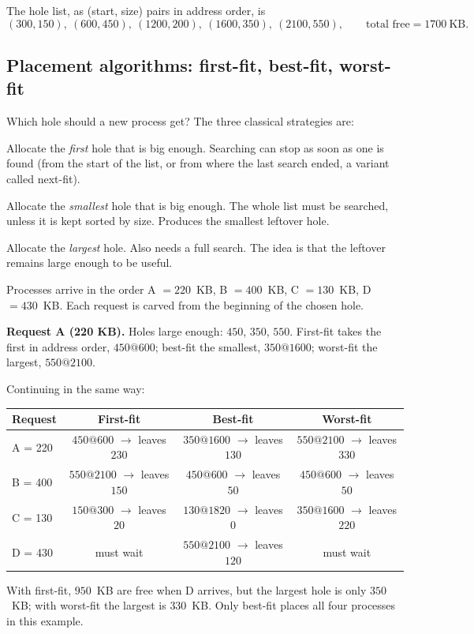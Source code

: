 \documentclass[11pt,a4paper]{article}
\begin{document}
The hole list, as (start, size) pairs in address order, is
\[
(300,150),\ (600,450),\ (1200,200),\ (1600,350),\ (2100,550),\qquad \text{total free} = 1700\ \text{KB}.
\]

\subsection{Placement algorithms: first-fit, best-fit, worst-fit}

Which hole should a new process get? The three classical strategies are:
\begin{description}[leftmargin=0pt,style=nextline,itemsep=0.3em]
  \item[First-fit] Allocate the \emph{first} hole that is big enough. Searching can stop as soon as one is found (from the start of the list, or from where the last search ended, a variant called next-fit).
  \item[Best-fit] Allocate the \emph{smallest} hole that is big enough. The whole list must be searched, unless it is kept sorted by size. Produces the smallest leftover hole.
  \item[Worst-fit] Allocate the \emph{largest} hole. Also needs a full search. The idea is that the leftover remains large enough to be useful.
\end{description}

\begin{example}
Processes arrive in the order A $=220$~KB, B $=400$~KB, C $=130$~KB, D $=430$~KB. Each request is carved from the beginning of the chosen hole.

\textbf{Request A (220 KB).} Holes large enough: $450$, $350$, $550$. First-fit takes the first in address order, $450@600$; best-fit the smallest, $350@1600$; worst-fit the largest, $550@2100$.

Continuing in the same way:
\begin{center}
\renewcommand{\arraystretch}{1.25}
\begin{tabular}{@{}lccc@{}}
\toprule
\textbf{Request} & \textbf{First-fit} & \textbf{Best-fit} & \textbf{Worst-fit} \\
\midrule
A = 220 & $450@600$ $\to$ leaves $230$ & $350@1600$ $\to$ leaves $130$ & $550@2100$ $\to$ leaves $330$ \\
B = 400 & $550@2100$ $\to$ leaves $150$ & $450@600$ $\to$ leaves $50$ & $450@600$ $\to$ leaves $50$ \\
C = 130 & $150@300$ $\to$ leaves $20$ & $130@1820$ $\to$ leaves $0$ & $350@1600$ $\to$ leaves $220$ \\
D = 430 & \textcolor{red!60!black}{must wait} & $550@2100$ $\to$ leaves $120$ & \textcolor{red!60!black}{must wait} \\
\bottomrule
\end{tabular}
\end{center}
With first-fit, $950$~KB are free when D arrives, but the largest hole is only $350$~KB; with worst-fit the largest is $330$~KB. Only best-fit places all four processes in this example.
\end{example}
\end{document}

